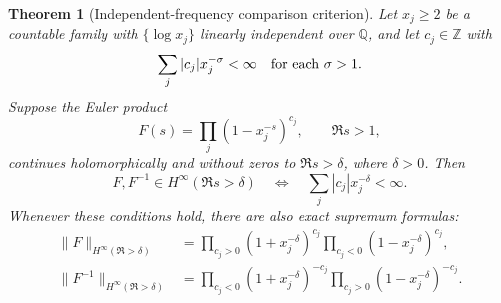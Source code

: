 \documentclass[12pt,letterpaper]{article}
\newtheorem{theorem}{Theorem}[section]
\numberwithin{equation}{section}
\theoremstyle{remark}
\begin{document}
\begin{theorem}[Independent-frequency comparison criterion]\label{thm:independent}
Let $x_j\ge2$ be a countable family with $\{\log x_j\}$ linearly independent over $\mathbb Q$, and let $c_j\in\mathbb Z$ with
\[
 \sum_j|c_j|x_j^{-\sigma}<\infty\quad\hbox{for each }\sigma>1.
\]
Suppose the Euler product
\begin{equation}\label{eq:EulerF}
 F(s)=\prod_j(1-x_j^{-s})^{c_j},\qquad\Re s>1,
\end{equation}
continues holomorphically and without zeros to $\Re s>\delta$, where $\delta>0$. Then
\begin{equation}\label{eq:maincriterion}
 \boxed{F,F^{-1}\in H^\infty(\Re s>\delta)
 \quad\Longleftrightarrow\quad\sum_j|c_j|x_j^{-\delta}<\infty.}
\end{equation}
Whenever these conditions hold, there are also exact supremum formulas:
\begin{align}
 \|F\|_{H^\infty(\Re>\delta)}
 &=\prod_{c_j>0}(1+x_j^{-\delta})^{c_j}
 \prod_{c_j<0}(1-x_j^{-\delta})^{c_j},\label{eq:norm1}\\
 \|F^{-1}\|_{H^\infty(\Re>\delta)}
 &=\prod_{c_j<0}(1+x_j^{-\delta})^{-c_j}
 \prod_{c_j>0}(1-x_j^{-\delta})^{-c_j}.\label{eq:norm2}
\end{align}
\end{theorem}
\end{document}
